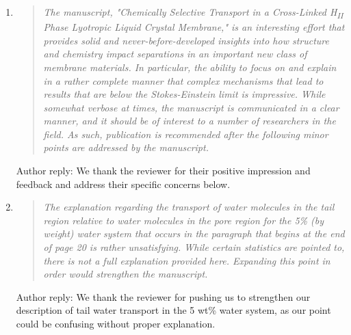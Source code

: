\documentclass{article}
\begin{document}
\begin{enumerate}
	
    \item \begin{quote} \textit{The manuscript, "Chemically Selective Transport 
    in a Cross-Linked H\textsubscript{II} Phase Lyotropic Liquid Crystal Membrane,"
    is an interesting effort that provides solid and never-before-developed insights
    into how structure and chemistry impact separations in an important new class of
    membrane materials. In particular, the ability to focus on and explain in a 
    rather complete manner that complex mechanisms that lead to results that are 
    below the Stokes-Einstein limit is impressive.  While somewhat verbose at times, 
    the manuscript is communicated in a clear manner, and it should be of interest 
    to a number of researchers in the field. As such, publication is recommended after
    the following minor points are addressed by the manuscript.} 
    \end{quote}
	
    Author reply: We thank the reviewer for their positive impression and feedback 
    and address their specific concerns below. 
	
    \item \begin{quote}
    \textit{The explanation regarding the transport of water molecules in the tail 
    region relative to water molecules in the pore region for the 5\% (by weight) 
    water system that occurs in the paragraph that begins at the end of page 20 is
    rather unsatisfying. While certain statistics are pointed to, there is not a 
    full explanation provided here. Expanding this point in order would strengthen
    the manuscript.}
    \end{quote}

    Author reply: We thank the reviewer for pushing us to strengthen our description
    of tail water transport in the 5 wt\% water system, as our point could be 
    confusing without proper explanation.


\end{enumerate}
\end{document}
